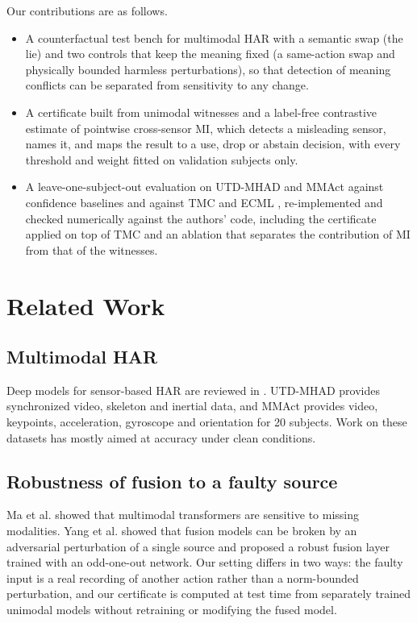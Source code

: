 \documentclass[conference]{IEEEtran}
\begin{document}
Our contributions are as follows.
\begin{itemize}
\item A counterfactual test bench for multimodal HAR with a semantic swap (the lie) and two controls that keep the meaning fixed (a same-action swap and physically bounded harmless perturbations), so that detection of meaning conflicts can be separated from sensitivity to any change.
\item A certificate built from unimodal witnesses and a label-free contrastive estimate of pointwise cross-sensor MI, which detects a misleading sensor, names it, and maps the result to a use, drop or abstain decision, with every threshold and weight fitted on validation subjects only.
\item A leave-one-subject-out evaluation on UTD-MHAD and MMAct against confidence baselines and against TMC \cite{Ref6} and ECML \cite{Ref7}, re-implemented and checked numerically against the authors' code, including the certificate applied on top of TMC and an ablation that separates the contribution of MI from that of the witnesses.
\end{itemize}

\section{Related Work}

\subsection{Multimodal HAR}
Deep models for sensor-based HAR are reviewed in \cite{Ref1}. UTD-MHAD \cite{Ref2} provides synchronized video, skeleton and inertial data, and MMAct \cite{Ref3} provides video, keypoints, acceleration, gyroscope and orientation for 20 subjects. Work on these datasets has mostly aimed at accuracy under clean conditions.

\subsection{Robustness of fusion to a faulty source}
Ma et al. \cite{Ref8} showed that multimodal transformers are sensitive to missing modalities. Yang et al. \cite{Ref9} showed that fusion models can be broken by an adversarial perturbation of a single source and proposed a robust fusion layer trained with an odd-one-out network. Our setting differs in two ways: the faulty input is a real recording of another action rather than a norm-bounded perturbation, and our certificate is computed at test time from separately trained unimodal models without retraining or modifying the fused model.
\end{document}
